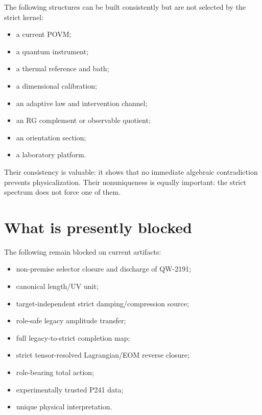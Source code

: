 \documentclass[11pt,a4paper,openany]{report}
\begin{document}
The following structures can be built consistently but are not selected by the strict kernel:

\begin{itemize}
\item 
a current POVM;

\item 
a quantum instrument;

\item 
a thermal reference and bath;

\item 
a dimensional calibration;

\item 
an adaptive law and intervention channel;

\item 
an RG complement or observable quotient;

\item 
an orientation section;

\item 
a laboratory platform.

\end{itemize}

Their consistency is valuable: it shows that no immediate algebraic contradiction prevents physicalization. Their nonuniqueness is equally important: the strict spectrum does not force one of them.

\section{What is presently blocked}

The following remain blocked on current artifacts:

\begin{itemize}
\item 
non-premise selector closure and discharge of QW-2191;

\item 
canonical length/\allowbreak{}UV unit;

\item 
target-independent strict damping/\allowbreak{}compression source;

\item 
role-safe legacy amplitude transfer;

\item 
full legacy-to-strict completion map;

\item 
strict tensor-resolved Lagrangian/\allowbreak{}EOM reverse closure;

\item 
role-bearing total action;

\item 
experimentally trusted P241 data;

\item 
unique physical interpretation.

\end{itemize}
\end{document}
